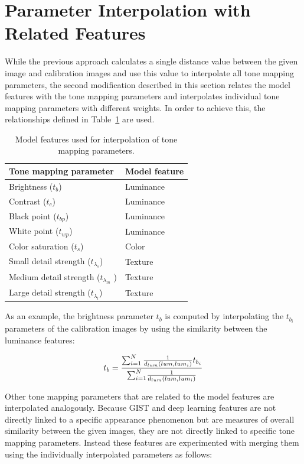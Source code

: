 \section{Parameter Interpolation with Related Features}
\label{sec:related_features}
While the previous approach calculates a single distance value between the given image and calibration images and use this value to interpolate all tone mapping parameters, the second modification described in this section relates the model features with the tone mapping parameters and interpolates individual tone mapping parameters with different weights. In order to achieve this, the relationships defined in Table~\ref{tab:feature_mapping} are used.

\begin{table}
\caption{Model features used for interpolation of tone mapping parameters.}
\centering
\begin{tabular}{l | l}
\label{tab:feature_mapping}
\textbf{Tone mapping parameter} & \textbf{Model feature}\\
\hline
Brightness ($t_b$) & Luminance \\
Contrast ($t_c$) & Luminance \\
Black point ($t_{bp}$) & Luminance \\
White point ($t_{wp}$) & Luminance \\
Color saturation ($t_s$) & Color \\
Small detail strength ($t_{\lambda_s}$) & Texture \\
Medium detail strength ($t_{\lambda_m}$ ) & Texture \\
Large detail strength ($t_{\lambda_l}$) & Texture
\end{tabular}
\end{table}


As an example, the brightness parameter $t_b$ is computed by interpolating the $t_{b_i}$ parameters of the calibration images by using the similarity between the luminance features:

\begin{equation}
   t_b = { {\sum_{i=1}^N { {1} \over {d_{lum} (lum, lum_i)} } t_{b_i} } \over {\sum_{i=1}^N} { {1} \over {d_{lum} (lum, lum_i)} } }
\end{equation}

Other tone mapping parameters that are related to the model features are interpolated analogously. Because GIST and deep learning features are not directly linked to a specific appearance phenomenon but are measures of overall similarity between the given images, they are not directly linked to specific tone mapping parameters. Instead these features are experimented with merging them using the individually interpolated parameters as follows: 

